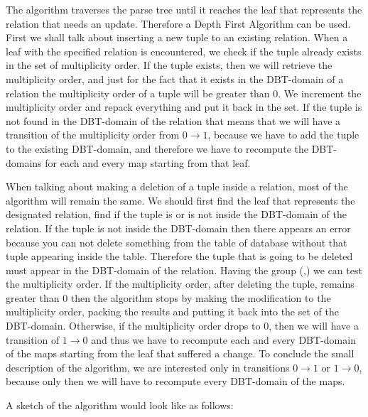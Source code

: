 \documentclass[12pt]{article}
\begin{document}
The algorithm traverses the parse tree until it reaches the leaf that represents the relation that needs an update. Therefore a Depth First Algorithm can be used. First we shall talk about inserting a new tuple to an existing relation. When a leaf with the specified relation is encountered, we check if the tuple already exists in the set of multiplicity order. If the tuple exists, then we will retrieve the multiplicity order, and just for the fact that it exists in the DBT-domain of a relation the multiplicity order of a tuple will be greater than 0. We increment the multiplicity order and repack everything and put it back in the set. If the tuple is not found in the DBT-domain of the relation that means that we will have a transition of the multiplicity order from $0 \rightarrow 1$, because we have to add the tuple to the existing DBT-domain, and therefore we have to recompute the DBT-domains for each and every map starting from that leaf.

When talking about making a deletion of a tuple inside a relation, most of the algorithm will remain the same. We should first find the leaf that represents the designated relation, find if the tuple is or is not inside the DBT-domain of the relation. If the tuple is not inside the DBT-domain then there appears an error because you can not delete something from the table of database without that tuple appearing inside the table. Therefore the tuple that is going to be deleted must appear in the DBT-domain of the relation. Having the group (\dom{},\multip) we can test the multiplicity order. If the multiplicity order, after deleting the tuple, remains greater than 0 then the algorithm stops by making the modification to the multiplicity order, packing the results and putting it back into the set of the DBT-domain. Otherwise, if the multiplicity order drops to 0, then we will have a transition of $1 \rightarrow 0$ and thus we have to recompute each and every DBT-domain of the maps starting from the leaf that suffered a change.
To conclude the small description of the algorithm, we are interested only in transitions $0 \rightarrow 1$ or $1 \rightarrow 0$, because only then we will have to recompute every DBT-domain of the maps.

A sketch of the algorithm would look like as follows:
\end{document}
